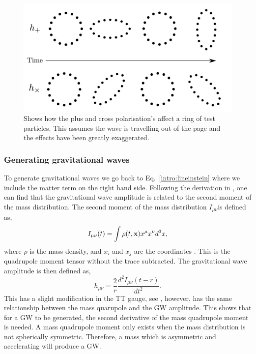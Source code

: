 \begin{figure}[h]
    \centering
    \includegraphics[width=\textwidth]{C1_Introduction/polarisation_ring.pdf}
    \caption{Shows how the plus and cross polarisation's affect a ring of test particles. This assumes the wave is travelling out of the page and the effects have been greatly exaggerated.}
    \label{gw:polarisations}
\end{figure}



\subsubsection{Generating gravitational waves}

To generate gravitational waves we go back to Eq.~\ref{intro:lineinstein} where we include the matter term on the right hand side.
Following the derivation in \cite{Flanagan2005TheTheory}, one can find that the gravitational wave amplitude is related to the second moment of the mass distribution.
The second moment of the mass distribution $I_{\mu\nu}$is defined as,
\begin{equation}
    I_{\mu \nu}(t) = \int \rho(t,{\bf x}) x^\mu x^\nu d^3x,
\end{equation}
where $\rho$ is the mass density, and $x_i$ and $x_j$ are the coordinates \cite{Flanagan2005TheTheory}. 
This is the quadrupole moment tensor without the trace subtracted.
The gravitational wave amplitude is then defined as,
\begin{equation}
\label{intro:gwamp}
    h_{\mu \nu} = \frac{2}{r}  \frac{d^2 I_{\mu \nu}(t-r)}{dt^2}.
\end{equation}
This has a slight modification in the TT gauge, see \cite{Flanagan2005TheTheory}, however, has the same relationship between the mass quarupole and the \ac{GW} amplitude.
This shows that for a \ac{GW} to be generated, the second derivative of the mass quadrupole moment is needed.
A mass quadrupole moment only exists when the mass distribution is not spherically symmetric.
Therefore, a mass which is asymmetric and accelerating will produce a \ac{GW}.

